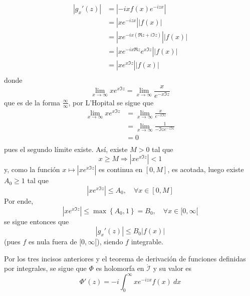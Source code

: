 \documentclass[12pt]{report}
\theoremstyle{largebreak}
\renewcommand{\leq}{\ensuremath{\leqslant}}
\renewcommand{\geq}{\ensuremath{\geqslant}}
\newcommand\abs[1]{\ensuremath{\left|#1\right|}}
\begin{document}
\begin{sol}
\begin{itemize}
\begin{equation*}
\begin{split}
                    \abs{g_x'(z)}&=\abs{-ixf(x)e^{ -izx}}\\
                    &=\abs{xe^{ -izx}}\abs{f(x)}\\
                    &=\abs{xe^{ -ix(\Re z+i\Im z)}}\abs{f(x)}\\
                    &=\abs{xe^{ -ix\Re z}e^{x\Im z}}\abs{f(x)}\\
                    &=\abs{xe^{x\Im z}}\abs{f(x)}\\
                \end{split}
            \end{equation*}
            donde
            \begin{equation*}
                \lim_{x\rightarrow\infty}xe^{x\Im z}=\lim_{x\rightarrow\infty}\frac{x}{e^{-x\Im z}}
            \end{equation*}
            que es de la forma $\frac{\infty}{\infty}$, por L'Hopital se sigue que
            \begin{equation*}
                \begin{split}
                    \lim_{x\rightarrow\infty}xe^{x\Im z}&=\lim_{x\rightarrow\infty}\frac{x}{e^{-x\Im z}}\\
                    &=\lim_{x\rightarrow\infty}\frac{1}{-\Im ze^{ -z\Im z}}\\
                    &=0\\
                \end{split}
            \end{equation*}
            pues el segundo límite existe. Así, existe $M>0$ tal que
            \begin{equation*}
                x\geq M\Rightarrow \abs{xe^{x\Im z}}<1
            \end{equation*}
            y, como la función $x\mapsto\abs{xe^{x\Im z}}$ es continua en $[0,M]$, es acotada, luego existe $A_0\geq 1$ tal que
            \begin{equation*}
                \abs{xe^{x\Im z}}\leq A_0,\quad\forall x\in[0,M]
            \end{equation*}
            Por ende,
            \begin{equation*}
                \abs{xe^{x\Im z}}\leq\max\left\{A_0,1\right\}=B_0,\quad\forall x\in[0,\infty[
            \end{equation*}
            se sigue entonces que
            \begin{equation*}
                \abs{g_x'(z)}\leq B_0\abs{f(x)}
            \end{equation*}
            (pues $f$ es nula fuera de $[0,\infty[$), siendo $f$ integrable.
        \end{itemize}
        Por los tres incisos anteriores y el teorema de derivación de funciones definidas por integrales, se sigue que $\Phi$ es holomorfa en $\mathring{\mathcal{I}}$ y su valor es
        \begin{equation*}
            \Phi'(z)=-i\int_{0}^{\infty}xe^{ -izx}f(x)\:dx
        \end{equation*}


\end{sol}
\end{document}
